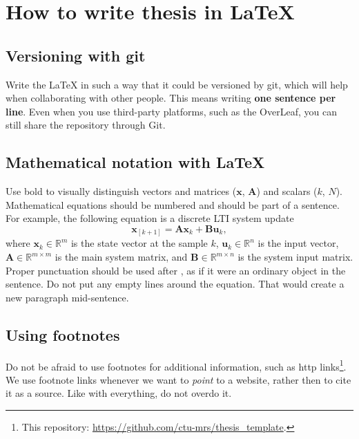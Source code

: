 
\chapter{How to write thesis in LaTeX\label{chap:how_to}}

\section{Versioning with git}

Write the LaTeX in such a way that it could be versioned by git, which will help when collaborating with other people.
This means writing \textbf{one sentence per line}.
Even when you use third-party platforms, such as the OverLeaf, you can still share the repository through Git.

\section{Mathematical notation with LaTeX}

Use bold to visually distinguish vectors and matrices ($\mathbf{x}$, $\mathbf{A}$) and scalars ($k$, $N$).
Mathematical equations should be numbered and should be part of a sentence.
For example, the following equation is a discrete LTI system update
\begin{equation}
  \mathbf{x}_{\left[k+1\right]} = \mathbf{A}\mathbf{x}_k + \mathbf{B}\mathbf{u}_k,
  \label{eq:lti_system}
\end{equation}
where $\mathbf{x}_k \in \mathbb{R}^m$ is the state vector at the sample $k$, $\mathbf{u}_k \in \mathbb{R}^n$ is the input vector, $\mathbf{A} \in \mathbb{R}^{m \times m}$ is the main system matrix, and $\mathbf{B} \in \mathbb{R}^{m \times n}$ is the system input matrix.
Proper punctuation should be used after , as if it were an ordinary object in the sentence.
Do not put any empty lines around the equation.
That would create a new paragraph mid-sentence.

\section{Using footnotes}

Do not be afraid to use footnotes for additional information, such as http links\footnote{This repository: \url{https://github.com/ctu-mrs/thesis_template}.}.
We use footnote links whenever we want to \emph{point} to a website, rather then to cite it as a source.
Like with everything, do not overdo it.

